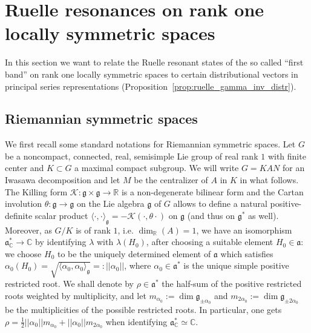 \documentclass[AHL, Unicode, longabstracts, published]{cedram}
\newcommand{\mc}{\mathcal}
\newcommand{\rr}{\mathbb{R}}
\newcommand{\cc}{\mathbb{C}}
\newcommand{\x}{\times}
\newcommand{\cjd}{\rangle}
\newcommand{\cjg}{\langle}
\newcommand{\demi}{\tfrac{1}{2}}
\newcommand{\R}{\mathbb R}
\newcommand{\g}{\mathfrak g}
\begin{document}
\section{Ruelle resonances on rank one locally symmetric spaces}
In this section we want to relate the Ruelle resonant states of the so called ``first band'' on rank one locally symmetric spaces to certain distributional vectors in principal series representations (Proposition~\ref{prop:ruelle_gamma_inv_distr}).

\subsection{Riemannian symmetric spaces}\label{sec:rieman_sym_space}
We first recall some standard notations for Riemannian symmetric spaces. Let $G$ be a noncompact, connected, real, semisimple Lie group of real rank $1$ with finite center and $K\subset G$ a maximal compact subgroup. We will write $G=KAN$ for an Iwasawa decomposition and let $M$ be the centralizer of $A$ in $K$ in what follows. The Killing form $\mc{K}:\mathfrak{g}\x \mathfrak{g}\to \rr$ is a non-degenerate bilinear form and the Cartan involution $\theta:\mathfrak{g}\to \mathfrak{g}$ on the Lie algebra $\mathfrak{g}$ of $G$ allows to define a natural positive-definite scalar product $\cjg \cdot,\cdot\cjd_{\mathfrak{g}}=-\mc{K}(\cdot,\theta\cdot)$ on $\mathfrak{g}$ (and thus on $\mathfrak g^*$ as well). Moreover, as $G/K$ is of rank $1$, i.e. $\dim_\R(A)=1$, we have an isomorphism $\mathfrak a_\cc^*\to \cc$ by identifying $\lambda$ with $\lambda(H_0)$, after choosing a suitable element $H_0\in\mathfrak a$: we choose $H_0$ to be the uniquely determined element of $\mathfrak a$ which satisfies $\alpha_0(H_0)=\sqrt{\cjg \alpha_0,\alpha_0\cjd_{\mathfrak{g}}}=:||\alpha_0||$, where $\alpha_0\in\mathfrak a^*$ is the unique simple positive restricted root. We shall denote by $\rho\in\mathfrak a^*$ the half-sum of the positive restricted roots weighted by multiplicity, and let $m_{\alpha_0} := \dim \g_{\pm\alpha_0}$ and $m_{2\alpha_0}:=\dim\g_{\pm2\alpha_0}$ be the multiplicities of the possible restricted roots. In particular, one gets $\rho=\demi ||\alpha_0||m_{\alpha_0}+||\alpha_0||m_{2\alpha_0}$ when identifying $\mathfrak a_\cc^*\simeq \cc$.
\end{document}
